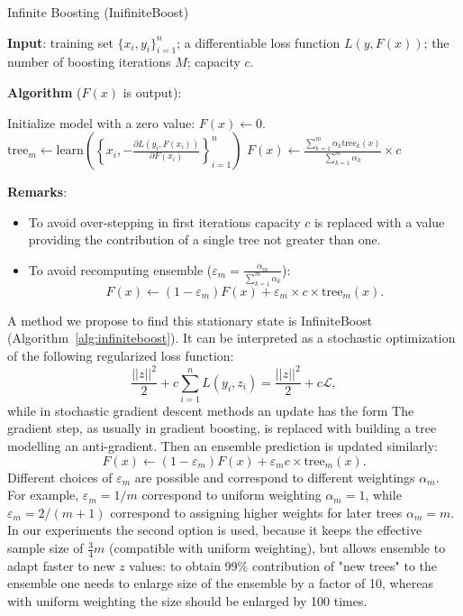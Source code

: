 \begin{algorithm}[!h]
  \caption{Infinite Boosting (InifiniteBoost)}\label{alg:infiniteboost}
  {\bf Input}: training set $\{x_i, y_i\}_{i=1}^n$; a differentiable loss function $L(y, F(x))$; the number of boosting iterations $M$; capacity $c$.

  {\bf Algorithm} ($F(x)$ is output):
  \begin{algorithmic}
    \State Initialize model with a zero value: $F(x) \gets 0$.
      \State $\text{tree}_m \gets \text{learn}\left(\left\{x_i, -\frac{\partial L(y_i, F(x_i))}{\partial F(x_i)}\right\}_{i=1}^n\right)$
      \State $F(x) \gets  \frac{\sum_{k=1}^m \alpha_k \text{tree}_k(x)}{\sum_{k=1}^m \alpha_k} \times c$
    \EndFor
  \end{algorithmic}

  {\bf Remarks}:
  \begin{itemize}
    \item To avoid over-stepping in first iterations capacity $c$ is replaced with a value providing the contribution of a single tree not greater than one.
    \item To avoid recomputing ensemble ($\varepsilon_m = \frac{\alpha_m}{\sum_{k=1}^m \alpha_k}$):
      \begin{equation*}
        F(x) \gets (1-\varepsilon_m)F(x) + \varepsilon_m \times c \times \text{tree}_m(x).
      \end{equation*}
  \end{itemize}
\end{algorithm}
A method we propose to find this stationary state is InfiniteBoost (Algorithm~\ref{alg:infiniteboost}).
It can be interpreted as a stochastic optimization of the following regularized loss function:
\begin{equation*}
  \dfrac{|| z ||^2}{2} + c \sum_{i=1}^n L(y_i, z_i) = \dfrac{|| z ||^2}{2} + c \mathcal{L},
\end{equation*}
while in stochastic gradient descent methods an update has the form
The gradient step, as usually in gradient boosting, is replaced with building a tree modelling an anti-gradient.
Then an ensemble prediction is updated similarly:
\begin{equation*}
    F(x) \leftarrow (1 - \varepsilon_m) F(x) + \varepsilon_m c \times \text{tree}_m(x).
\end{equation*}
Different choices of $\varepsilon_m$ are possible and correspond to different weightings $\alpha_m$.
For example, $\varepsilon_m = 1 / m$ correspond to uniform weighting $\alpha_m = 1$,
while $\varepsilon_m = 2 / (m + 1)$ correspond to assigning higher weights for later trees $\alpha_m = m$.
In our experiments the second option is used, because it keeps the effective sample size of $\frac{3}{4}m$ (compatible with uniform weighting),
but allows ensemble to adapt faster to new $z$ values:
to obtain 99\% contribution of "new trees" to the ensemble one needs to enlarge size of the ensemble by a factor of 10,
whereas with uniform weighting the size should be enlarged by 100 times.

